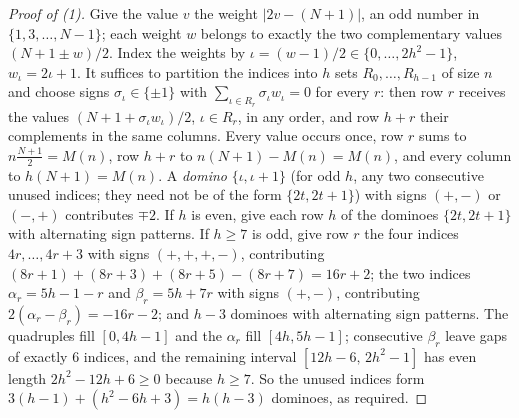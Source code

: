 \begin{proof}[Proof of (1)]
Give the value $v$ the weight $|2v-(N+1)|$, an odd number in $\{1,3,\dots,N-1\}$; each weight $w$ belongs to exactly the two complementary values $(N+1\pm w)/2$.
Index the weights by $\iota=(w-1)/2\in\{0,\dots,2h^2-1\}$, $w_\iota=2\iota+1$.
It suffices to partition the indices into $h$ sets $R_0,\dots,R_{h-1}$ of size $n$ and choose signs $\sigma_\iota\in\{\pm1\}$ with $\sum_{\iota\in R_r}\sigma_\iota w_\iota=0$ for every $r$: then row $r$ receives the values $(N+1+\sigma_\iota w_\iota)/2$, $\iota\in R_r$, in any order, and row $h+r$ their complements in the same columns.
Every value occurs once, row $r$ sums to $n\frac{N+1}2=M(n)$, row $h+r$ to $n(N+1)-M(n)=M(n)$, and every column to $h(N+1)=M(n)$.
A \emph{domino} $\{\iota,\iota+1\}$ (for odd $h$, any two consecutive unused indices; they need not be of the form $\{2t,2t+1\}$) with signs $(+,-)$ or $(-,+)$ contributes $\mp2$.
If $h$ is even, give each row $h$ of the dominoes $\{2t,2t+1\}$ with alternating sign patterns.
If $h\ge7$ is odd, give row $r$ the four indices $4r,\dots,4r+3$ with signs $(+,+,+,-)$, contributing $(8r+1)+(8r+3)+(8r+5)-(8r+7)=16r+2$; the two indices $\alpha_r=5h-1-r$ and $\beta_r=5h+7r$ with signs $(+,-)$, contributing $2(\alpha_r-\beta_r)=-16r-2$; and $h-3$ dominoes with alternating sign patterns.
The quadruples fill $[0,4h-1]$ and the $\alpha_r$ fill $[4h,5h-1]$; consecutive $\beta_r$ leave gaps of exactly $6$ indices, and the remaining interval $[12h-6,\,2h^2-1]$ has even length $2h^2-12h+6\ge0$ because $h\ge7$.
So the unused indices form $3(h-1)+(h^2-6h+3)=h(h-3)$ dominoes, as required.
\end{proof}

